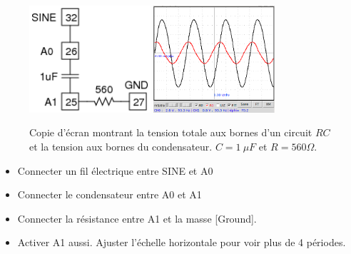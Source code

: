 \documentclass{book}
\begin{document}
\begin{figure}[h!]
\begin{center}
\caption{\label{fig:CRcircuit-voltages}Copie d'écran montrant la tension totale aux bornes d'un circuit $RC$ et la tension aux bornes du condensateur. $C = 1\ \mu F$ et $R = 560 \Omega$. }\vspace{0.5em}
\includegraphics[width=0.4\textwidth, height=0.3\textwidth, keepaspectratio]{Schematic-rc-steadystate.png}
\includegraphics[width=0.4\textwidth, height=0.3\textwidth, keepaspectratio]{Pic-CRphaseshift-1uf560.png}
\end{center}
\end{figure}



\begin{itemize}
  \item Connecter un fil électrique entre SINE et A0
\end{itemize}



\begin{itemize}
  \item Connecter le condensateur entre A0 et A1
\end{itemize}



\begin{itemize}
  \item Connecter la résistance entre A1 et la masse [Ground].
\end{itemize}



\begin{itemize}
  \item Activer A1 aussi. Ajuster l'échelle horizontale pour voir plus de 4 périodes.
\end{itemize}
\end{document}
